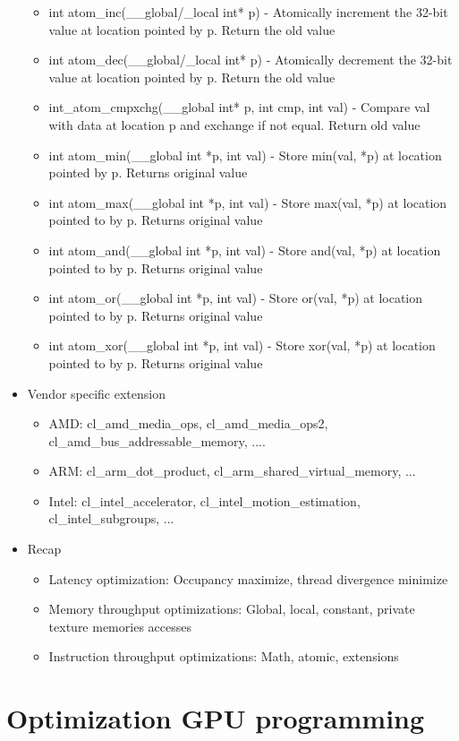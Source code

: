 \documentclass[paper=a4, fontsize=11pt]{scrartcl} %
\numberwithin{equation}{section} %
\numberwithin{figure}{section} %
\numberwithin{table}{section} %
\begin{document}
\begin{itemize}
\begin{itemize}
    \item int atom_inc(__global/_local int* p) - Atomically increment the 32-bit value at location pointed by p. Return the old value
    \item int atom_dec(__global/_local int* p) - Atomically decrement the 32-bit value at location pointed by p. Return the old value
    \item int_atom_cmpxchg(__global int* p, int cmp, int val) - Compare val with data at location p and exchange if not equal. Return old value
    \item int atom_min(__global int *p, int val) - Store min(val, *p) at location pointed by p. Returns original value
    \item int atom_max(__global int *p, int val) - Store max(val, *p) at location pointed to by p. Returns original value
    \item int atom_and(__global int *p, int val) - Store and(val, *p) at location pointed to by p. Returns original value
    \item int atom_or(__global int *p, int val) - Store or(val, *p) at location pointed to by p. Returns original value
    \item int atom_xor(__global int *p, int val) - Store xor(val, *p) at location pointed to by p. Returns original value
  \end{itemize}
  \item Vendor specific extension
  \begin{itemize}
    \item AMD: cl_amd_media_ops, cl_amd_media_ops2, cl_amd_bus_addressable_memory, ....
    \item ARM: cl_arm_dot_product, cl_arm_shared_virtual_memory, ...
    \item Intel: cl_intel_accelerator, cl_intel_motion_estimation, cl_intel_subgroups, ...
  \end{itemize}
  \item Recap
  \begin{itemize}
    \item Latency optimization: Occupancy maximize, thread divergence minimize
    \item Memory throughput optimizations: Global, local, constant, private texture memories accesses
    \item Instruction throughput optimizations: Math, atomic, extensions
  \end{itemize}
\end{itemize}

\section{Optimization GPU programming}
\end{document}
